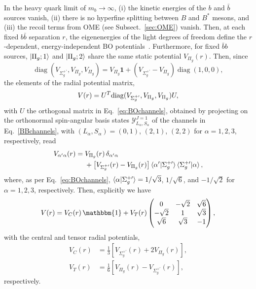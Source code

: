 \documentclass[aps,prd,showpacs,amsmath,twocolumn,superscriptaddress,floatfix,nofootinbib,notitlepage]{revtex4-2}
\newcommand{\be}{\begin{equation}}
\newcommand{\ee}{\end{equation}}
\begin{document}
In the heavy quark limit of $m_b{\to}\infty$, (i) the kinetic energies of the $b$ and $\bar{b}$ sources vanish, (ii) there is no hyperfine splitting between $B$ and $B^*$ mesons, and (iii) the recoil terms from OME (see Subsect.~\ref{sec:OME}) vanish. Then, at each fixed $b\bar{b}$ separation $r$, the eigenenergies of the light degrees of freedom define the $r$-dependent, energy-independent BO potentials~\cite{Juge:1997nc,Braaten:2014qka}.
Furthermore, for fixed $\bar{b}b$ sources, $\ket{\Pi_g;1}$ and $\ket{\Pi_g;2}$ share the same static potential $V_{\Pi_g}(r)$. 
Then, since 
\be
\operatorname{diag}(V_{\Sigma_g^{+\prime}},V_{\Pi_g},V_{\Pi_g})=V_{\Pi_g}\bm{1}+(V_{\Sigma_g^{+\prime}}-V_{\Pi_g})\operatorname{diag}(1,0,0),
\ee
the elements of the radial potential matrix, 
\be
V(r)=U^{T}{\rm diag}(V_{\Sigma_g^{+\prime}},V_{\Pi_g},V_{\Pi_g})U,
\ee
with $U$ the orthogonal matrix in Eq.~\eqref{eq:BOchannels}, obtained by projecting on the orthonormal spin-angular basis states $\mathcal{Y}^{J=1}_{L_\alpha,S_\alpha}$ of the channels in Eq.~\eqref{BBchannels}, with $(L_\alpha,S_\alpha)=(0,1)$, $(2,1)$, $(2,2)$ for $\alpha=1,2,3$, respectively,
read
\be
\begin{split}
V_{\alpha'\alpha}(r)={}&V_{\Pi_g}(r)\,\delta_{\alpha'\alpha}\\
&+\big[V_{\Sigma_g^{+\prime}}(r)-V_{\Pi_g}(r)\big]\braket{\alpha'|\Sigma_g^{+\prime}}\braket{\Sigma_g^{+\prime}|\alpha},
\end{split}
\label{eq:Vstatic}
\ee
where, as per Eq.~\eqref{eq:BOchannels}, $\braket{\alpha|\Sigma_g^{+\prime}}=1/\sqrt3$, $1/\sqrt6$, and $-1/\sqrt2$ for $\alpha=1,2,3$, respectively.
Then, explicitly we have
\be
V(r)
=
V_C(r)\,\mathbbm{1}
+
V_T(r)
\begin{pmatrix}
0 & -\sqrt2 & \sqrt6\\
-\sqrt2 & 1 & \sqrt3\\
\sqrt6 & \sqrt3 & -1
\end{pmatrix},
\label{eq:cylindricalstuff}
\ee
with the central and tensor radial potentials,
\be
\begin{split}
V_C(r) &= \frac13 \left[V_{\Sigma_g^{+\prime}}(r)+2V_{\Pi_g}(r)\right], \\
V_T(r) &= \frac16\left[V_{\Pi_g}(r) - V_{\Sigma_g^{+\prime}}(r) \right],
\end{split}
\label{eq:VCT-BO}
\ee
respectively.
\end{document}
